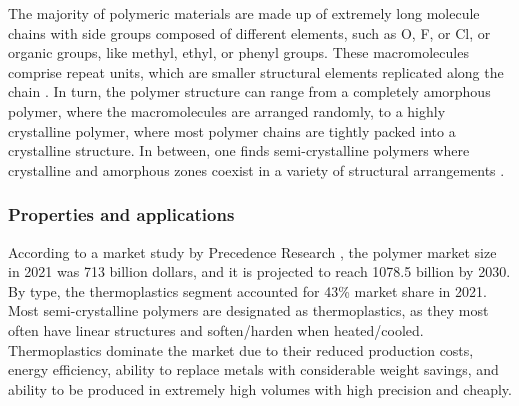 The majority of polymeric materials are made up of extremely long molecule chains with side groups composed of different elements, such as O, F, or Cl, or organic groups, like methyl, ethyl, or phenyl groups.
These macromolecules comprise repeat units, which are smaller structural elements replicated along the chain \citep{callister2014materials}.
In turn, the polymer structure can range from a completely amorphous polymer, where the macromolecules are arranged randomly, to a highly crystalline polymer, where most polymer chains are tightly packed into a crystalline structure.
In between, one finds semi-crystalline polymers where crystalline and amorphous zones coexist in a variety of structural arrangements \citep{wardIntroductionMechanicalProperties2004}.

\subsubsection{Properties and applications}

According to a market study by Precedence Research \citep{precedenceresearchPolymersMarketProduct2022}, the polymer market size in 2021 was 713 billion dollars, and it is projected to reach 1078.5 billion by 2030.
By type, the thermoplastics segment accounted for 43\% market share in 2021.
Most semi-crystalline polymers are designated as thermoplastics, as they most often have linear structures and soften/harden when heated/cooled.
Thermoplastics dominate the market due to their reduced production costs, energy efficiency, ability to replace metals with considerable weight savings, and ability to be produced in extremely high volumes with high precision and cheaply.

